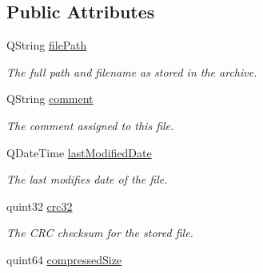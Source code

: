 \subsection*{Public Attributes}
\begin{DoxyCompactItemize}
\item 
Q\+String \hyperlink{class_zip_file_info_ac32470d6ef45541b30f12a12fc603192}{file\+Path}\hypertarget{class_zip_file_info_ac32470d6ef45541b30f12a12fc603192}{}\label{class_zip_file_info_ac32470d6ef45541b30f12a12fc603192}

\begin{DoxyCompactList}\small\item\em The full path and filename as stored in the archive. \end{DoxyCompactList}\item 
Q\+String \hyperlink{class_zip_file_info_aa6614798700a47f90f46f6a91674c954}{comment}\hypertarget{class_zip_file_info_aa6614798700a47f90f46f6a91674c954}{}\label{class_zip_file_info_aa6614798700a47f90f46f6a91674c954}

\begin{DoxyCompactList}\small\item\em The comment assigned to this file. \end{DoxyCompactList}\item 
Q\+Date\+Time \hyperlink{class_zip_file_info_a20e1b125e61f8cd47fe31d17b57358c4}{last\+Modified\+Date}\hypertarget{class_zip_file_info_a20e1b125e61f8cd47fe31d17b57358c4}{}\label{class_zip_file_info_a20e1b125e61f8cd47fe31d17b57358c4}

\begin{DoxyCompactList}\small\item\em The last modifies date of the file. \end{DoxyCompactList}\item 
quint32 \hyperlink{class_zip_file_info_a7e4527e9861accbb956312499f773e5f}{crc32}\hypertarget{class_zip_file_info_a7e4527e9861accbb956312499f773e5f}{}\label{class_zip_file_info_a7e4527e9861accbb956312499f773e5f}

\begin{DoxyCompactList}\small\item\em The C\+RC checksum for the stored file. \end{DoxyCompactList}\item 
quint64 \hyperlink{class_zip_file_info_a35a18493b5bfe8d4fcf256e808582b25}{compressed\+Size}\hypertarget{class_zip_file_info_a35a18493b5bfe8d4fcf256e808582b25}{}\label{class_zip_file_info_a35a18493b5bfe8d4fcf256e808582b25}


\end{DoxyCompactItemize}
